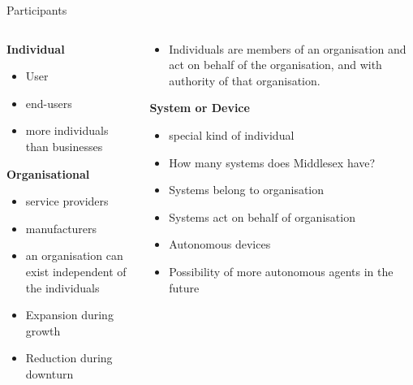 \documentclass[pdf,table]{beamer}
\begin{document}
\begin{frame}{Participants}
	\begin{columns}[T]
		\begin{column}{0.48\textwidth}
			{\bf Individual}
			\begin{itemize}
				\item User 
				\item end-users 
				\item more individuals than businesses 
			\end{itemize}
			{\bf Organisational}
			\begin{itemize}
				\item service providers
				\item manufacturers
				\item an organisation can exist independent of the individuals %
				\item Expansion during growth
				\item Reduction during downturn
		\end{itemize}
		\end{column}
		\begin{column}{0.48\textwidth}
			\begin{itemize}
				\item Individuals are members of an organisation and act on behalf of the organisation, and with authority of that organisation.
			\end{itemize}			
			{\bf System or Device}
			\begin{itemize}
				\item special kind of individual
				\item How many systems does Middlesex have? %
				\item Systems belong to organisation
				\item Systems act on behalf of organisation
				\item Autonomous devices 
				\item Possibility of more autonomous agents in the future
			\end{itemize}
		\end{column}
	\end{columns}	
\end{frame}
\end{document}

